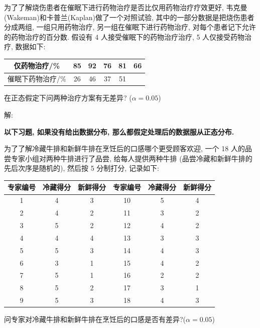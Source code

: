 \documentclass[standard]{ExBook}
\begin{document}
\begin{qitems}
    \begin{bbox}
    \begin{shaded}
        \qitem
为了了解烧伤患者在催眠下进行药物治疗是否比仅用药物治疗疗效更好, 韦克曼(Wakeman)和卡普兰(Kaplan)做了一个对照试验, 其中的一部分数据是把烧伤患者分成两组, 一组只用药物治疗, 另一组在催眠下进行药物治疗, 对每个患者记下允许的药物治疗的百分数. 假设有 4 人接受催眠下的药物治疗治疗, 5 人仅接受药物治疗, 数据如下:
\begin{center}
\setlength{\tabcolsep}{27pt}
\begin{tabular}{c|ccccc}
\hline
仅药物治疗/\% & 85 & 92 & 76 & 81 & 66 \\
\hline
催眠下药物治疗/\% & 26 & 46 & 37 & 51 & \\
\hline
\end{tabular}
\end{center}
在正态假定下问两种治疗方案有无差异? ($\alpha = 0.05$)
    \end{shaded}
    \end{bbox}

\vspace{-5em}

    \begin{bbox}
解: 
    \end{bbox}

\vspace{3em}

    \begin{center}
\textbf{以下习题, 如果没有给出数据分布, 那么都假定处理后的数据服从正态分布.}
    \end{center}

    \begin{bbox}
    \begin{shaded}
        \qitem
为了了解冷藏牛排和新鲜牛排在烹饪后的口感哪个更受顾客欢迎, 一个 18 人的品尝专家小组对两种牛排进行了品尝, 给每人提供两种牛排 (品尝冷藏和新鲜牛排的先后次序是随机的), 然后按 5 分制打分, 记录如下:
\begin{center}
\renewcommand{\arraystretch}{1}
\setlength{\tabcolsep}{16pt}
\begin{tabular}{c|cc||c|cc}
\hline
专家编号 & 冷藏得分 & 新鲜得分 & 专家编号 & 冷藏得分 & 新鲜得分 \\
\hline
1 & 4 & 3 & 10 & 5 & 4 \\
2 & 4 & 2 & 11 & 3 & 2 \\
3 & 5 & 2 & 12 & 4 & 2 \\
4 & 4 & 4 & 13 & 3 & 3 \\
5 & 5 & 3 & 14 & 4 & 3 \\
6 & 3 & 1 & 15 & 4 & 2 \\
7 & 5 & 1 & 16 & 2 & 2 \\
8 & 5 & 2 & 17 & 3 & 1 \\
9 & 5 & 3 & 18 & 4 & 3 \\
\hline
\end{tabular}
\end{center}
问专家对冷藏牛排和新鲜牛排在烹饪后的口感是否有差异?($\alpha = 0.05$)
    \end{shaded}
    \end{bbox}


\end{qitems}
\end{document}
